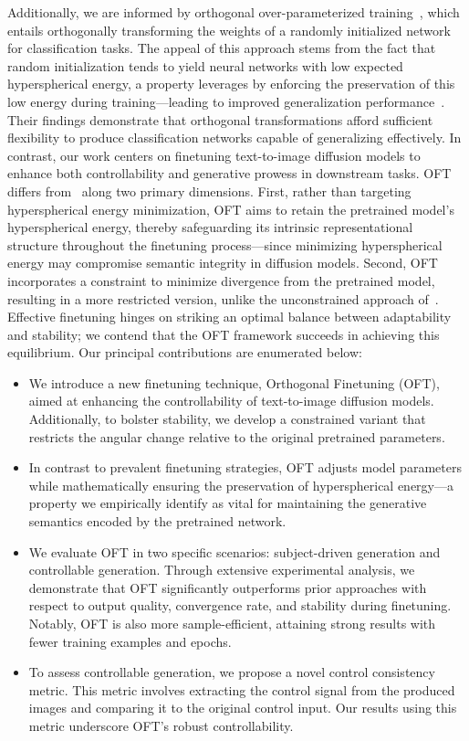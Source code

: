 Additionally, we are informed by orthogonal over-parameterized training~\cite{liu2021orthogonal}, which entails orthogonally transforming the weights of a randomly initialized network for classification tasks. The appeal of this approach stems from the fact that random initialization tends to yield neural networks with low expected hyperspherical energy, a property \cite{liu2021orthogonal} leverages by enforcing the preservation of this low energy during training—leading to improved generalization performance~\cite{liu2018learning,lin2020regularizing}. Their findings demonstrate that orthogonal transformations afford sufficient flexibility to produce classification networks capable of generalizing effectively. In contrast, our work centers on finetuning text-to-image diffusion models to enhance both controllability and generative prowess in downstream tasks. OFT differs from~\cite{liu2021orthogonal} along two primary dimensions. First, rather than targeting hyperspherical energy minimization, OFT aims to retain the pretrained model’s hyperspherical energy, thereby safeguarding its intrinsic representational structure throughout the finetuning process—since minimizing hyperspherical energy may compromise semantic integrity in diffusion models. Second, OFT incorporates a constraint to minimize divergence from the pretrained model, resulting in a more restricted version, unlike the unconstrained approach of~\cite{liu2021orthogonal}. Effective finetuning hinges on striking an optimal balance between adaptability and stability; we contend that the OFT framework succeeds in achieving this equilibrium. Our principal contributions are enumerated below:

\begin{itemize}[leftmargin=*,nosep]

    \item We introduce a new finetuning technique, Orthogonal Finetuning (OFT), aimed at enhancing the controllability of text-to-image diffusion models. Additionally, to bolster stability, we develop a constrained variant that restricts the angular change relative to the original pretrained parameters.
    \item In contrast to prevalent finetuning strategies, OFT adjusts model parameters while mathematically ensuring the preservation of hyperspherical energy—a property we empirically identify as vital for maintaining the generative semantics encoded by the pretrained network.
    \item We evaluate OFT in two specific scenarios: subject-driven generation and controllable generation. Through extensive experimental analysis, we demonstrate that OFT significantly outperforms prior approaches with respect to output quality, convergence rate, and stability during finetuning. Notably, OFT is also more sample-efficient, attaining strong results with fewer training examples and epochs.
    \item To assess controllable generation, we propose a novel control consistency metric. This metric involves extracting the control signal from the produced images and comparing it to the original control input. Our results using this metric underscore OFT's robust controllability.
\end{itemize}

